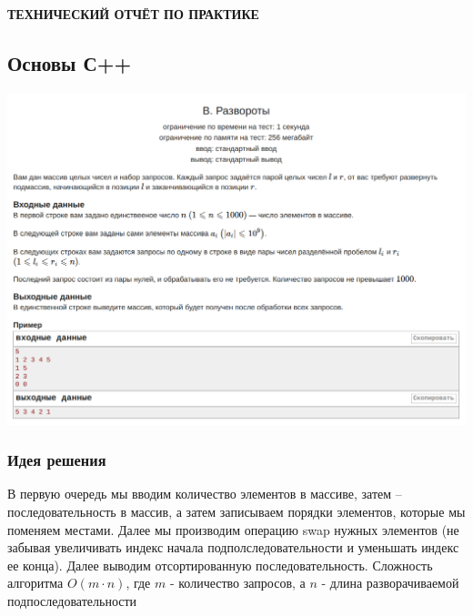 
\begin{center}
\bfseries{\large ТЕХНИЧЕСКИЙ ОТЧЁТ ПО ПРАКТИКЕ}
\end{center}

\subsection*{Основы С++}
\begin{center}
\includegraphics[width=\textwidth]{statements/Contest1B.png}
\end{center}

\subsubsection*{Идея решения}

В первую очередь мы вводим количество элементов в массиве, затем – последовательность в массив, а затем записываем порядки элементов, которые мы поменяем местами.
Далее мы производим операцию swap нужных элементов (не забывая увеличивать индекс начала подполследовательности и уменьшать индекс ее конца). Далее выводим отсортированную последовательность.
Сложность алгоритма $O(m \cdot n)$, где $m$ - количество запросов, а $n$ - длина разворачиваемой подпоследовательности

